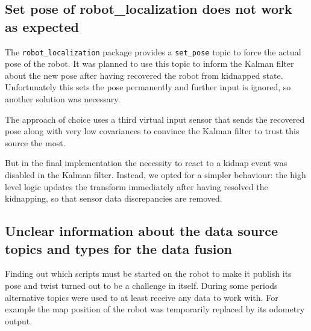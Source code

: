 \subsection{Set pose of robot\_localization does not work as expected}
The \texttt{robot\_localization} package provides a \texttt{set\_pose} topic to force the actual pose of the robot. It was planned to use this topic to inform the Kalman filter about the new pose after having recovered the robot from kidnapped state. Unfortunately this sets the pose permanently and further input is ignored, so another solution was necessary.

The approach of choice uses a third virtual input sensor that sends the recovered pose along with very low covariances to convince the Kalman filter to trust this source the most.

But in the final implementation the necessity to react to a kidnap event was disabled in the Kalman filter. Instead, we opted for a simpler behaviour: the high level logic updates the transform immediately after having resolved the kidnapping, so that sensor data discrepancies are removed. 

\subsection{Unclear information about the data source topics and types for the data fusion}
Finding out which scripts must be started on the robot to make it publish its pose and twist turned out to be a challenge in itself. During some periods alternative topics were used to at least receive any data to work with. For example the map position of the robot was temporarily replaced by its odometry output.
